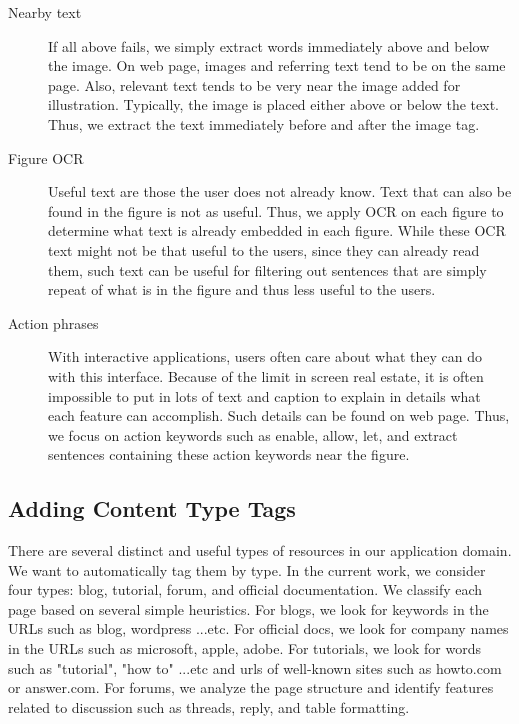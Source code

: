 \documentclass{www2010-submission}
\begin{document}
\begin{description}
\item[Nearby text] If all above fails, we simply extract
words immediately above and below the image. On web page, images
and referring text tend to be on the same page. Also, relevant
text tends to be very near the image added for illustration.
Typically, the image is placed either above or below the text.
Thus, we extract the text immediately before and after the image
tag.

\item[Figure OCR] Useful text are those the user does not already
know. Text that can also be found in the figure is not as useful.
Thus, we apply OCR on each figure to determine what text is
already embedded in each figure. While these OCR text might not be
that useful to the users, since they can already read them, such
text can be useful for filtering out sentences that are simply
repeat of what is in the figure and thus less useful to the users.

\item[Action phrases] With interactive applications, users
often care about what they can do with this interface. Because of
the limit in screen real estate, it is often impossible to put in
lots of text and caption to explain in details what each feature
can accomplish. Such details can be found on web page. Thus, we
focus on action keywords such as enable, allow, let, and extract
sentences containing these action keywords near the figure.

\end{description}

\subsection{Adding Content Type Tags}

There are several distinct and useful types of resources in our
application domain. We want to automatically tag them by type. In
the current work, we consider four types: blog, tutorial, forum,
and official documentation. We classify each page based on several
simple heuristics. For blogs, we look for keywords in the URLs
such as blog, wordpress ...etc. For official docs, we look for
company names in the URLs such as microsoft, apple, adobe. For
tutorials, we look for words such as "tutorial", "how to" ...etc
and urls of well-known sites such as howto.com or answer.com. For
forums, we analyze the page structure and identify features
related to discussion such as threads, reply, and table
formatting.
\end{document}
